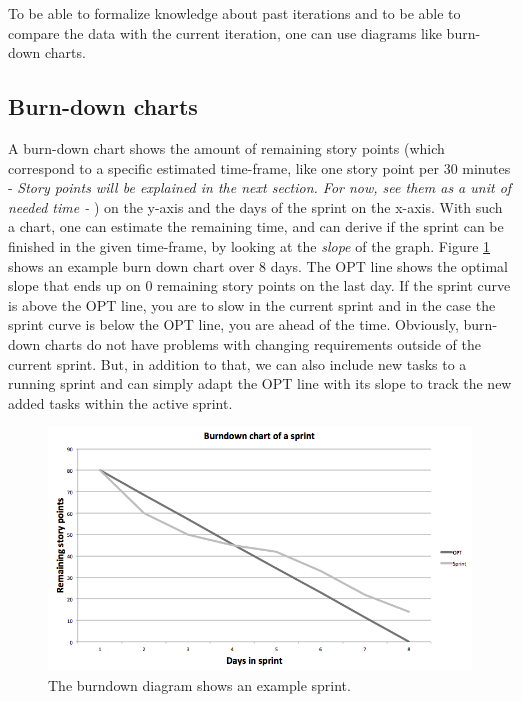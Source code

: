 To be able to formalize knowledge about past iterations and to be able to compare the data with the current iteration, one can use diagrams like burn-down charts.

\subsection{Burn-down charts}
A burn-down chart shows the amount of remaining story points (which correspond to a specific estimated time-frame, like one story point per 30 minutes - \emph{Story points will be explained in the next section. For now, see them as a unit of needed time - }) on the y-axis and the days of the sprint on the x-axis. With such a chart, one can estimate the remaining time, and can derive if the sprint can be finished in the given time-frame, by looking at the \textit{slope} of the graph. Figure \ref{Burndown example} shows an example burn down chart over 8 days. The OPT line shows the optimal slope that ends up on 0 remaining story points on the last day. If the sprint curve is above the OPT line, you are to slow in the current sprint and in the case the sprint curve is below the OPT line, you are ahead of the time. Obviously, burn-down charts do not have problems with changing requirements outside of the current sprint. But, in addition to that, we can also include new tasks to a running sprint and can simply adapt the OPT line with its slope to track the new added tasks within the active sprint. 

\begin{figure}[th]
\centerline{\includegraphics[width=1\textwidth]{gfx/burndown}}
\caption{The burndown diagram shows an example sprint.}
\label{Burndown example}
\end{figure}

